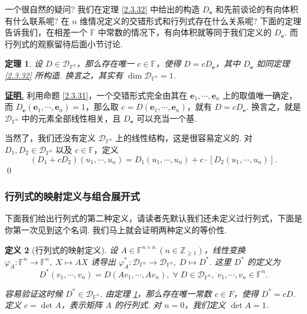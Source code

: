 \documentclass[10pt,openany]{article}
\theoremstyle{thmstyle} %
\newtheorem{theorem}{定理}[subsection]
\theoremstyle{defstyle} %
\newtheorem{definition}[theorem]{定义}
\theoremstyle{prostyle} %
\theoremstyle{exastyle}
\theoremstyle{remstyle}
\renewenvironment{proof}[1][证明]{\par\underline{\textbf{#1.}} \;\fangsong}{\qed\par}
\newcommand{\F}{\mathbb{F}}
\newcommand{\n}{^{n \times n}}
\newcommand{\bme}{\bm{e}}
\begin{document}
一个很自然的疑问? 我们在定理 \ref{2.3.32} 中给出的构造 \( D_{\bm{e}} \) 和先前谈论的有向体积有什么联系呢? 在 \( n \) 维情况定义的交错形式和行列式存在什么关系呢? 下面的定理告诉我们，在相差一个 \( \F \) 中常数的情况下，有向体积就等同于我们定义的 \( D_{\bm{e}} \). 而行列式的观察留待后面小节讨论.

\begin{theorem} \label{2.3.33}
	设 \( D \in \mathcal{D}_{\F^n} \)，那么存在唯一 \( c \in \F \)，使得 \( D=cD_{\bme} \)，其中 \( D_{\bme} \) 如同定理 \ref{2.3.32} 所构造. 换言之，其实有 \( \dim \mathcal{D}_{\F^n}=1 \).
\end{theorem}

\begin{proof}
	利用命题 \ref{2.3.31}，一个交错形式完全由其在 \( \bme_1,\cdots,\bme_n \) 上的取值唯一确定，而 \( D_{\bm{e}}(\bme_1,\cdots,\bme_n)=1 \)，那么取 \( c=D(\bme_1,\cdots,\bme_n) \)，就有 \( D=cD_{\bm{e}} \). 换言之，就是 \( \mathcal{D}_{\F^n} \) 中的元素全部线性相关，且 \( D_{\bm{e}} \) 可以充当一个基. 
	
	当然了，我们还没有定义 \( \mathcal{D}_{\F^n} \) 上的线性结构，这是很容易定义的. 对 \( D_1,D_2 \in \mathcal{D}_{\F^n} \) 以及 \( c \in \F \)，定义
	\[ (D_1+cD_2)(u_1,\cdots,u_n)=D_1(u_1,\cdots,u_n)+c \cdot [D_2(u_1,\cdots,u_n)]. \]
\end{proof}

\subsubsection{行列式的映射定义与组合展开式}

下面我们给出行列式的第二种定义，请读者先默认我们还未定义过行列式，下面是你第一次见到这个名词. 我们马上就会证明两种定义的等价性.

\begin{definition}[行列式的映射定义] \label{2.3.34}
	设 \( A \in \F\n \ (n \in \mathbb{Z}_{\geq 1}) \)，线性变换 \( \varphi_{A}: \F^n \to \F^n, \; X \mapsto AX \) 诱导出 \( \varphi^*_{A}: \mathcal{D}_{\F^n} \to \mathcal{D}_{\F^n}, \; D \mapsto D^* \). 这里 \( D^* \) 的定义为
	\[ D^*(v_1,\cdots,v_n)=D(Av_1,\cdots,Av_n), \; \forall \; D \in \mathcal{D}_{\F^n}, \; v_1,\cdots,v_n \in \F^n. \]
	
	容易验证这时候 \( D^* \in \mathcal{D}_{\F^n} \). 由定理 \ref{2.3.33}，那么存在唯一常数 \( c \in F \)，使得 \( D^*=cD \). 定义 \( c=\det A \)，表示矩阵 \( A \) 的行列式. 对 \( n=0 \)，我们定义 \( \det A=1 \).
\end{definition}
\end{document}
